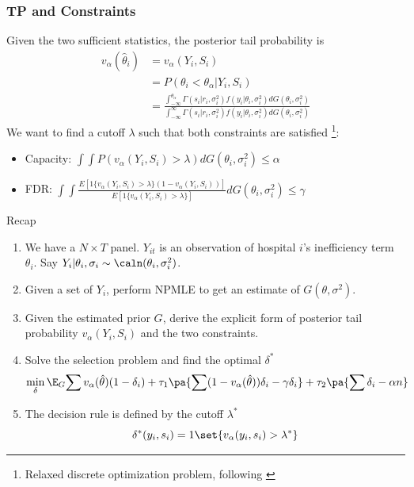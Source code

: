 \documentclass[10pt, aspectratio=169]{beamer}
\begin{document}
\begin{frame}
  \frametitle{TP and Constraints}
  Given the two sufficient statistics, the posterior tail probability is
  \begin{align*}
    v_\alpha(\hat{\theta}_i) & =v_\alpha(Y_i,S_i)                                                                                                         \\
                             & = P( \theta_i < \theta_{\alpha} | Y_i,S_i)                                                                                 \\
                             & = \frac{{\int_{-\infty}^{\theta_{\alpha}} \Gamma(s_i|r_i,\sigma_i^2) f(y_i|\theta_i, \sigma_i^2) dG(\theta_i,\sigma_i^2)}}
    {{\int_{-\infty}^{\infty} \Gamma(s_i|r_i,\sigma_i^2) f(y_i|\theta_i, \sigma_i^2) dG(\theta_i,\sigma_i^2)}}
  \end{align*}
  We want to find a cutoff $\lambda$ such that both constraints are satisfied \footnote{Relaxed discrete optimization problem, following \citep{basu2018weighted}}:\\
  \begin{itemize}\itemsep=8pt
    \item Capacity: $\int \int P(v_\alpha(Y_i, S_i) > \lambda) dG(\theta_i,\sigma_i^2)
            \leq \alpha$
    \item FDR: $\int \int
            \frac{E[1\{v_\alpha(Y_i,S_i)>\lambda\}(1-v_\alpha(Y_i,S_i))]}{E[1\{v_\alpha(Y_i,S_i)>\lambda\}]}
            dG(\theta_i,\sigma_i^2) \leq \gamma$
  \end{itemize}
\end{frame}

\begin{frame}{Recap}

  \begin{enumerate}
    \item We have a $N\times T$ panel. $Y_{it}$ is an observation of hospital $i$'s
          inefficiency term $\theta_i$. Say $Y_{i}|\theta_i,\sigma_i \sim
            \caln(\theta_i,\sigma_i^2)$.
    \item Given a set of $Y_{i}$, perform NPMLE to get an estimate of
          $G(\theta,\sigma^2)$.
    \item Given the estimated prior $G$, derive the explicit form of posterior tail
          probability $v_\alpha(Y_i,S_i)$ and the two constraints.
    \item Solve the selection problem and find the optimal $\delta^*$
          \begin{equation*}
            \min_{\delta}\E_G{\sum v_\alpha(\hat{\theta})(1-\delta_i) +\tau_1\pa{\sum (1-v_\alpha(\hat{\theta}))\delta_i -\gamma \delta_i} + \tau_2 \pa{\sum \delta_i -\alpha n}}
          \end{equation*}
    \item The decision rule is defined by the cutoff $\lambda^*$
          \[\delta^*(y_i,s_i)=1\set{v_\alpha(y_i,s_i)>\lambda^*}\]
  \end{enumerate}
\end{frame}
\end{document}
